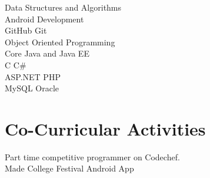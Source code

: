 \documentclass[]{denish-resume-openfont}
\begin{document}
\begin{minipage}[t]{0.69\textwidth}
\textbullet{} Data Structures and Algorithms \\
\textbullet{} Android Development \\
\textbullet{} GitHub \hspace{1mm} \textbullet{} Git \\
\textbullet{} Object Oriented Programming \\
\textbullet{} Core Java and Java EE \\
\textbullet{} C \hspace{2mm} \textbullet{} C\# \\
\textbullet{} ASP.NET \hspace{1mm} \textbullet{} PHP  \\ 
\textbullet{} MySQL \hspace{3mm} \textbullet{} Oracle\\
\sectionsep




\section{Co-Curricular Activities}
\textbullet{} Part time competitive programmer on Codechef. \\
\textbullet{} Made College Festival Android App \\
\sectionsep

\end{minipage}
\end{document}
